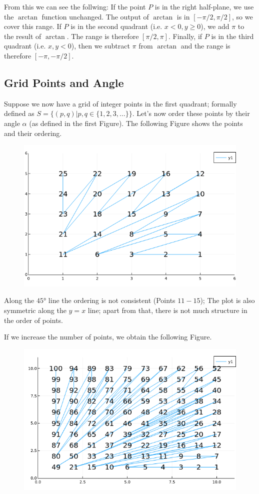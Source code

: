 From this we can see the follwing: If the point $P$ is in the right half-plane, we use the $\arctan$ function unchanged. The output of $\arctan$ is in $[-\pi/2, \pi/2]$, so we cover this range. If $P$ is in the second quadrant (i.e. $x < 0, y \geq 0$), we add $\pi$ to the result of $\arctan$. The range is therefore $[\pi/2, \pi]$. Finally, if $P$ is in the third quadrant (i.e. $x, y < 0$), then we subtract $\pi$ from $\arctan$ and the range is therefore $[-\pi, -\pi/2]$.


\subsection{Grid Points and Angle}

Suppose we now have a grid of integer points in the first quadrant; formally defined as $S = \{ (p,q) | p,q \in \{1,2,3,\ldots\} \}$. Let's now order these points by their angle $\alpha$ (as defined in the first Figure). The following Figure shows the points and their ordering.


\begin{figure}[H]
\centering
\includegraphics[scale=0.5]{images/AoC_2019_10_03.png}
\end{figure}

Along the $45°$ line the ordering is not consistent (Points $11 - 15$); The plot is also symmetric along the $y = x$ line; apart from that, there is not much structure in the order of points.

If we increase the number of points, we obtain the following Figure.

\begin{figure}[H]
\centering
\includegraphics[scale=0.5]{images/AoC_2019_10_04.png}
\end{figure}



